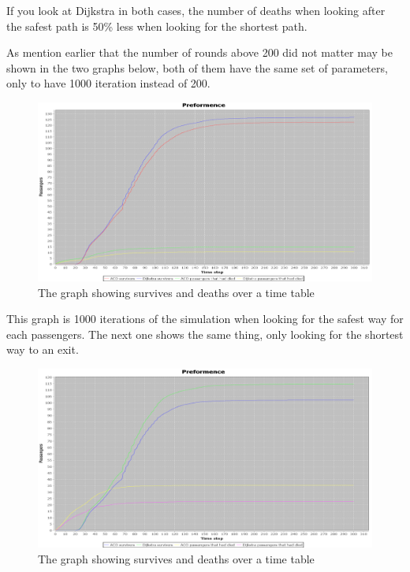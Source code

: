 If you look at Dijkstra in both cases, the number of deaths when looking after the safest path is 50\% less when looking for the shortest path.

As mention earlier that the number of rounds above 200 did not matter may be shown in the two graphs below, both of them have the same set of parameters, only to have 1000 iteration instead of 200.

\begin{figure} [h]
\centering
\hspace*{-1.0in}
\includegraphics[scale=0.35]{images/Graph-using-1000-rounds-140-passangers-safest-path-and-one-fire.png}
\caption{The graph showing survives and deaths over a time table}
\label{fig:celebSafty1000round}
\end{figure}

This graph is 1000 iterations of the simulation when looking for the safest way for each passengers. The next one shows the same thing, only looking for the shortest way to an exit.

\begin{figure} [h]
\centering
\hspace*{-1.0in}
\includegraphics[scale=0.35]{images/Graph-using-1000-rounds-140-passangers-shortest-path-and-one-fire.png}
\caption{The graph showing survives and deaths over a time table}
\label{fig:celebShort1000round}
\end{figure}


